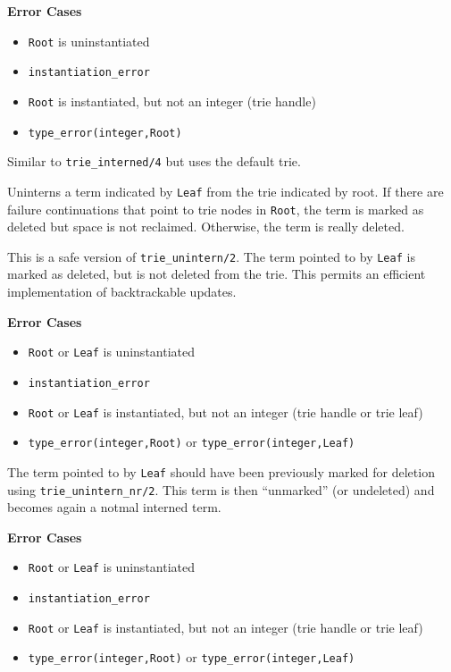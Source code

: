 \begin{description}
{\bf Error Cases}
\begin{itemize}
\item 	{\tt Root} is uninstantiated
\bi
\item 	 {\tt instantiation\_error}
\ei
\item 	{\tt Root} is instantiated, but not an integer (trie handle)
\bi
\item 	 {\tt type\_error(integer,Root)}
\ei
\end{itemize}

 
Similar to {\tt trie\_interned/4}  but uses the default trie.

 
Uninterns a term indicated by {\tt Leaf} from the trie indicated by
root.  If there are failure continuations that point to trie nodes in
{\tt Root}, the term is marked as deleted but space is not reclaimed.
Otherwise, the term is really deleted.

This is a safe version of {\tt trie\_unintern/2}. The term pointed to by
{\tt Leaf} is marked as deleted, but is not deleted from the trie. This
permits an efficient implementation of backtrackable updates.

{\bf Error Cases}
\begin{itemize}
\item 	{\tt Root} or {\tt Leaf} is uninstantiated
\bi
\item 	 {\tt instantiation\_error}
\ei
\item 	{\tt Root} or {\tt Leaf} is instantiated, but not an integer
  (trie handle or trie leaf) 
\bi
\item 	 {\tt type\_error(integer,Root)} or {\tt type\_error(integer,Leaf)}
\ei
\end{itemize}

The term pointed to by {\tt Leaf} should have been previously marked for
deletion using
{\tt trie\_unintern\_nr/2}. This term is then ``unmarked'' (or undeleted)
and becomes again a notmal interned term.

{\bf Error Cases}
\begin{itemize}
\item 	{\tt Root} or {\tt Leaf} is uninstantiated
\bi
\item 	 {\tt instantiation\_error}
\ei
\item 	{\tt Root} or {\tt Leaf} is instantiated, but not an integer
  (trie handle or trie leaf) 
\bi
\item 	 {\tt type\_error(integer,Root)} or {\tt type\_error(integer,Leaf)}
\ei
\end{itemize}


\end{description}
